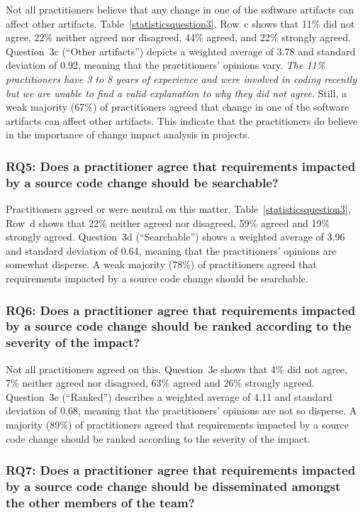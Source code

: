\documentclass[conference]{IEEEtran}
\begin{document}
Not all practitioners believe that any change in one of the software
artifacts can affect other artifacts. Table~\ref{statisticsquestion3},
Row~c shows that 11\% did not agree, 22\% neither agreed nor
disagreed, 44\% agreed, and 22\% strongly agreed. Question~3c (``Other
artifacts'') depicts a weighted average of 3.78 and standard deviation
of 0.92, meaning that the practitioners' opinions vary. \textit{The
  11\% practitioners have 3 to 8 years of experience and were involved
  in coding recently but we are unable to find a valid explanation to
  why they did not agree}. Still, a weak majority (67\%) of
practitioners agreed that change in one of the software artifacts can
affect other artifacts. This indicate that the practitioners do
believe in the importance of change impact analysis in projects.

\subsubsection{RQ5: Does a practitioner agree that requirements
  impacted by a source code change should be searchable?}

Practitioners agreed or were neutral on this
matter. Table~\ref{statisticsquestion3}, Row~d shows that 22\% neither
agreed nor disagreed, 59\% agreed and 19\% strongly
agreed. Question~3d (``Searchable'') shows a weighted average of 3.96
and standard deviation of 0.64, meaning that the practitioners'
opinions are somewhat disperse. A weak majority (78\%) of
practitioners agreed that requirements impacted by a source code
change should be searchable.

\subsubsection{RQ6: Does a practitioner agree that requirements
  impacted by a source code change should be ranked according to the
  severity of the impact?}

Not all practitioners agreed on this. Question~3e shows that 4\% did
not agree, 7\% neither agreed nor disagreed, 63\% agreed and 26\%
strongly agreed. Question~3e (``Ranked'') describes a weighted average
of 4.11 and standard deviation of 0.68, meaning that the
practitioners' opinions are not so disperse. A majority (89\%) of
practitioners agreed that requirements impacted by a source code
change should be ranked according to the severity of the impact.

\subsubsection{RQ7: Does a practitioner agree that requirements
  impacted by a source code change should be disseminated amongst the
  other members of the team?} 
\end{document}
